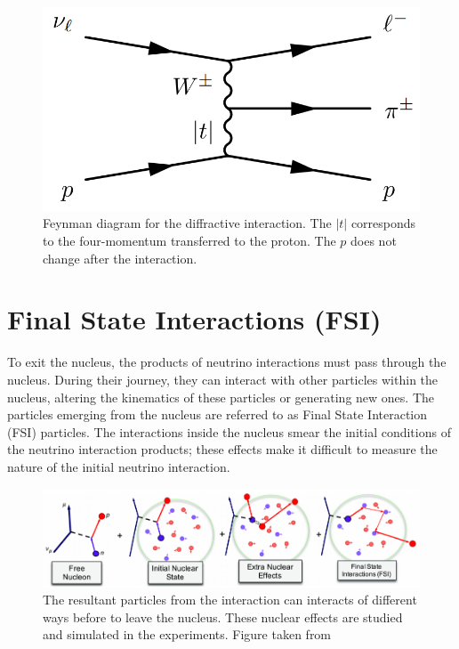 \begin{figure}[!htb]
    \centering
    \includegraphics[scale=0.3]{Figures/Chapter1/DiffractiveFeynman.png}
    \caption{Feynman diagram for the diffractive interaction. The $|t|$ corresponds to the four-momentum transferred to the proton. The $p$ does not change after the interaction.} 
    \label{fig:Int:NuInteractions:Diffractive}
\end{figure}

\section{Final State Interactions (FSI)}
\label{Cap:Int:FSI}
To exit the nucleus, the products of neutrino interactions must pass through the nucleus. During their journey, they can interact with other particles within the nucleus, altering the kinematics of these particles or generating new ones. The particles emerging from the nucleus are referred to as Final State Interaction (FSI) particles. The interactions inside the nucleus smear the initial conditions of the neutrino interaction products; these effects make it difficult to measure the nature of the initial neutrino interaction. 

\begin{figure}[!htb]
    \centering
    \includegraphics[scale=0.35]{Figures/Chapter1/FSIProcess.png}
    \caption{The resultant particles from the interaction can interacts of different ways before to leave the nucleus. These nuclear effects are studied and simulated in the experiments. Figure taken from }
    \label{fig:Int:FSI:FSIProcess}
\end{figure}

